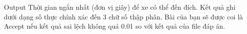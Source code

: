 Output
Thời gian ngắn nhất (đơn vị giây) để xe có thể đến đích. Kết quả ghi dưới dạng số thực chính xác đến 3 chữ số thập phân. Bài của bạn sẽ được coi là Accept nếu kết quả sai lệch không quá 0.01 so với kết quả của file đáp án.